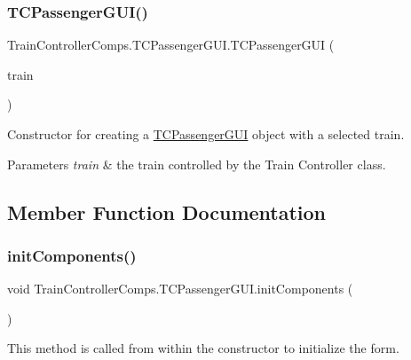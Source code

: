 \subsubsection{\texorpdfstring{T\+C\+Passenger\+G\+U\+I()}{TCPassengerGUI()}\hspace{0.1cm}{\footnotesize\ttfamily [2/2]}}
{\footnotesize\ttfamily Train\+Controller\+Comps.\+T\+C\+Passenger\+G\+U\+I.\+T\+C\+Passenger\+G\+UI (\begin{DoxyParamCaption}\item[{\hyperlink{classTrainControllerComps_1_1TestTrain}{Test\+Train}}]{train }\end{DoxyParamCaption})}



Constructor for creating a \hyperlink{classTrainControllerComps_1_1TCPassengerGUI}{T\+C\+Passenger\+G\+UI} object with a selected train. 


\begin{DoxyParams}{Parameters}
{\em train} & the train controlled by the Train Controller class. \\
\hline
\end{DoxyParams}


\subsection{Member Function Documentation}
\mbox{\label{classTrainControllerComps_1_1TCPassengerGUI_a0470c9528fe420297061ed084b92e7c4}} 
\subsubsection{\texorpdfstring{init\+Components()}{initComponents()}}
{\footnotesize\ttfamily void Train\+Controller\+Comps.\+T\+C\+Passenger\+G\+U\+I.\+init\+Components (\begin{DoxyParamCaption}{ }\end{DoxyParamCaption})\hspace{0.3cm}{\ttfamily [private]}}



This method is called from within the constructor to initialize the form. 


